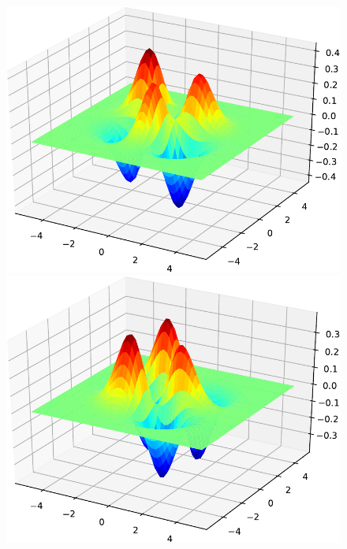 \begin{figure}[H]
{\includegraphics[scale=0.3]{../codes/sch_2d/IMG_harmonic_psi_9.pdf}%
\includegraphics[scale=0.3]{../codes/sch_2d/IMG_harmonic_psi_10.pdf}
\par}
\label{fig:harm_2d_eigenfunctions}
\end{figure}

